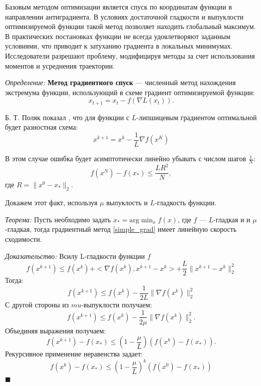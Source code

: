 Базовым методом оптимизации является спуск по координатам функции в направлении антиградиента. 
В условиях достаточной гладкости и выпуклости оптимизируемой функции такой метод позволяет находить глобальный максимум. 
В практических постановках функции не всегда удовлетворяют заданным условиями, что приводит к затуханию градиента 
в локальных минимумах. Исследователи разрешают проблему, модифицируя методы за счет использования моментов
и усреднения траектории.

\textit{Определение:} \textbf{Метод градиентного спуск} --- численный метод нахождения экстремума функции, использующий
в схеме градиент оптимизируемой функции:
\begin{equation}
    x_{t+1} = x_t - f(\nabla L(x_t)).
\end{equation}

Б. Т. Поляк показал \cite{polyak1990new}, что для функции с $L$-липшицевым градиентом оптимальной будет разностная схема: 
\begin{equation}
    x^{k+1} = x^k - \frac{1}{L} \nabla f(x^K)
    \label{simple_grad}
\end{equation}

В этом случае ошибка будет асимптотически линейно убывать с числом шагов $\frac{1}{N}$:
\begin{equation}
    f(x^N) -f(x_*) \le \frac{L R^2}{N},
\end{equation}
где $R=\| x^0 - x_* \|_2$. 

Докажем этот факт, используя $\mu$ выпуклость и $L$-гладкость функции.

\textit{Теорема:} Пусть необходимо задать $x_*=\text{arg} \min_x f(x)$, где $f$ --- $L$-гладкая и
и $\mu$ -гладкая, тогда градиентный метод \ref{simple_grad} имеет линейную скорость сходимости.

\textit{Доказательство:} Всилу L-гладкости функции $f$
\begin{equation}
    f(x^{k+1}) \le f(x^k) + <\nabla f(x^k), x^{k+1} -x^k> +\frac{L}{2} \|x^{k+1}-x^k\|_2^2
\end{equation}
Тогда:
\begin{equation}
    f(x^{k+1}) \le f(x^k) - \frac{1}{2L} \| \nabla f(x^k) \|^2_2
\end{equation}
С другой стороны из $mu$-выпуклости получаем:
\begin{equation}
    f(x^{k+1}) \le f(x^k) - \frac{1}{2\mu} \| \nabla f(x^k) \|^2_2.
\end{equation}
Объединяя выражения получаем:
\begin{equation}
    f(x^{k+1}) -f(x_*) \le \left(1-\frac{\mu}{L}\right) (f(x^k)-f(x_*)).
\end{equation}
Рекурсивное применение неравенства задает:
\begin{equation}
    f(x^k) - f(x_*) \le (1-\frac{\mu}{L})^k (f(x^0)-f(x_*))
\end{equation}
$\blacksquare$

